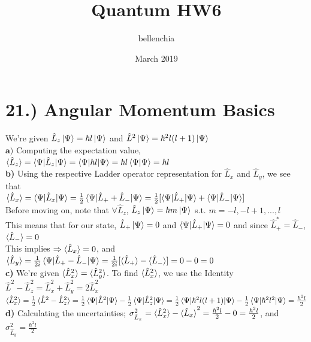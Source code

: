 \documentclass[12pt]{article}
\title{Quantum HW6}
\author{bellenchia}
\date{March 2019}
\begin{document}
\maketitle
\section*{21.) Angular Momentum Basics}
We're given $\hat{L}_z\ket{\Psi}=\hbar l\ket{\Psi} $ and $\hat{L}^2\ket{\Psi}=\hbar^2l(l+1)\ket{\Psi}$\\

$\textbf{a)}$ Computing the expectation value, $\braket{\hat{L}_z}=\braket{\Psi|\hat{L}_z|\Psi}=\braket{\Psi|\hbar l|\Psi}=\hbar l\braket{\Psi|\Psi}=\hbar l$\\

\textbf{b)} Using the respective Ladder operator representation for $\hat{L}_x$ and $\hat{L}_y$, we see that\\

$\braket{\hat{L}_x}=\braket{\Psi|\hat{L}_x|\Psi}=\frac{1}{2}\braket{\Psi|\hat{L}_++\hat{L}_-|\Psi}=\frac{1}{2}[\braket{\Psi|\hat{L}_+|\Psi}+\braket{\Psi|\hat{L}_-|\Psi}]$\\

Before moving on, note that $\forall\hat{L}_z$, $\hat{L}_z\ket{\Psi}=\hbar m\ket{\Psi}$ s.t. $m=-l,-l+1,...,l$\\

This means that for our state, $\hat{L}_+\ket{\Psi}=0$ and $\braket{\Psi|\hat{L}_+|{\Psi}}=0$ and since $\hat{L}_+^*=\hat{L}_-$, $\braket{\hat{L}_-}=0$\\ 

This implies $\Rightarrow\braket{\hat{L}_x}=0$, and $\braket{\hat{L}_y}=\frac{1}{2i}\braket{\Psi|\hat{L}_+-\hat{L}_-|\Psi}=\frac{1}{2i}[\braket{\hat{L}_+}-\braket{\hat{L}_-}]=0-0=0$\\

\textbf{c)} We're given $\braket{\hat{L}_x^2}=\braket{\hat{L}_y^2}$. To find $\braket{\hat{L}_x^2}$, we use the Identity $\hat{L}^2-\hat{L}_z^2=\hat{L}_x^2+\hat{L}_y^2=2\hat{L}_x^2$\\

$\braket{\hat{L}_x^2}=\frac{1}{2}\braket{ \hat{L}^2-\hat{L}_z^2 }=\frac{1}{2}\braket{ \Psi|\hat{L}^2|\Psi}-\frac{1}{2}\braket{\Psi|\hat{L}_z^2|\Psi}=\frac{1}{2}\braket{ \Psi|\hbar^2l(l+1)|\Psi}-\frac{1}{2}\braket{\Psi|\hbar^2l^2|\Psi}=\frac{\hbar^2 l}{2}$\\

\textbf{d)} Calculating the uncertainties; $\sigma_{\hat{L}_x}^2=\braket{\hat{L}_x^2}-\braket{\hat{L}_x}^2=\frac{\hbar^2 l}{2}-0=\frac{\hbar^2 l}{2}$, and $\sigma_{\hat{L}_y}^2=\frac{\hbar^2 l}{2}$\\
\end{document}
